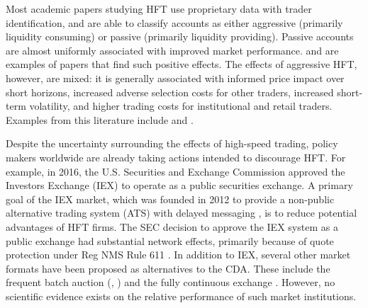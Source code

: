 \documentclass[12pt]{article}
\begin{document}
Most academic papers studying HFT use proprietary data with trader identification, and are able to classify accounts as either aggressive (primarily liquidity consuming) or passive (primarily liquidity providing). Passive accounts are almost uniformly associated with improved market performance. \cite{Hagstromer2013, Malinova2014, Brogaard2015b, Jovanovic2015} and \cite{Menkveld2017} are examples of papers that find such positive effects.
The effects of aggressive HFT, however, are mixed: it is generally associated with informed price impact over short horizons, increased adverse selection costs for other traders, increased short-term volatility, and higher trading costs for institutional and retail traders. Examples from this literature include \cite{Zhang2011, Bershova2012, Breckenfelder2013, Brogaard2013,  Hasbrouck2013,  Hendershott2013, Hirschey2013, Baldauf2015, Baldauf2015a, Brogaard2015a} and \cite{Menkveld2017}.

Despite the uncertainty surrounding the effects of high-speed trading, policy makers worldwide are already taking actions intended to discourage HFT. For example, in 2016, the U.S. Securities and Exchange Commission approved the Investors Exchange (IEX) to operate as a public securities exchange. A primary goal of the IEX market, which was founded in 2012 to provide a non-public alternative trading system (ATS) with delayed messaging \citep[see][]{Aldrich2017}, is to reduce potential advantages of HFT firms. The SEC decision to approve the IEX system as a public exchange had substantial network effects, primarily because of quote protection under Reg NMS Rule 611 \citep{Hu2018}. In addition to IEX, several other market formats have been proposed as alternatives to the CDA. These include the frequent batch auction (\cite{Budish2015}, \cite{Budish2014}) and the fully continuous exchange \citep{Kyle2017}. However, no scientific evidence exists on the relative performance of such market institutions.
\end{document}
